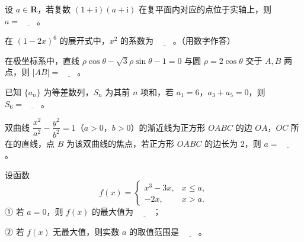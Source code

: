 \begin{question}
设 \(a\in\mathbf{R}\)，若复数 \((1+\mathrm{i})(a+\mathrm{i})\) 在复平面内对应的点位于实轴上，则 \(a=\underline{\qquad}\)。

\end{question}
\begin{question}
在 \((1-2x)^{6}\) 的展开式中，\(x^{2}\) 的系数为 \(\underline{\qquad}\)。（用数字作答）

\end{question}
\begin{question}
在极坐标系中，直线 \(\rho\cos\theta-\sqrt{3}\rho\sin\theta-1=0\) 与圆 \(\rho=2\cos\theta\) 交于 \(A,B\) 两点，则 \(|AB|=\underline{\qquad}\)。

\end{question}
\begin{question}
已知 \(\{a_{n}\}\) 为等差数列，\(S_{n}\) 为其前 \(n\) 项和，若 \(a_{1}=6\)，\(a_{3}+a_{5}=0\)，则 \(S_{6}=\underline{\qquad}\)。

\end{question}
\begin{question}
双曲线 \(\dfrac{x^{2}}{a^{2}}-\dfrac{y^{2}}{b^{2}}=1\)（\(a>0\)，\(b>0\)）的渐近线为正方形 \(OABC\) 的边 \(OA\)，\(OC\) 所在的直线，点 \(B\) 为该双曲线的焦点，若正方形 \(OABC\) 的边长为 \(2\)，则 \(a=\underline{\qquad}\)。

\end{question}
\begin{question}
设函数
\nopagebreak[4]
\[
f(x)=\begin{cases}
x^{3}-3x, & x\leqslant a,\\
-2x, & x>a.
\end{cases}
\]
① 若 \(a=0\)，则 \(f(x)\) 的最大值为 \(\underline{\qquad}\)；

② 若 \(f(x)\) 无最大值，则实数 \(a\) 的取值范围是 \(\underline{\qquad}\)。

\end{question}

